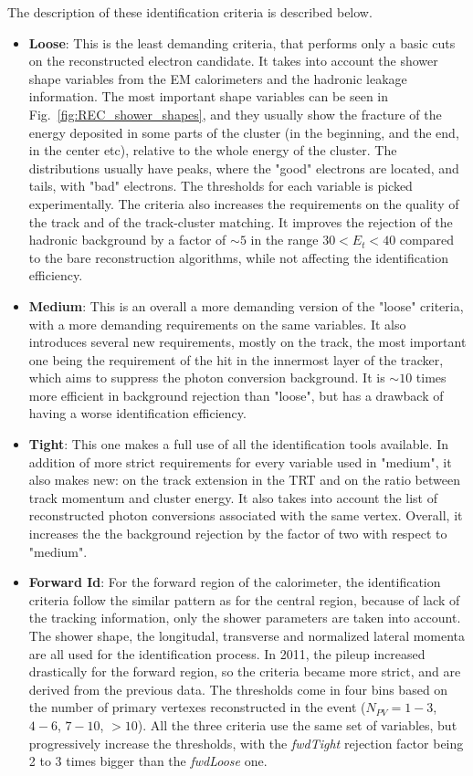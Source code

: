 The description of these identification criteria is described below.
\begin{itemize}
\item {\bfseries Loose}: This is the least demanding criteria, that performs only a basic cuts on the reconstructed electron candidate. It takes into account the shower shape variables from the EM calorimeters and the hadronic leakage information. The most important shape variables can be seen in Fig.~\ref{fig:REC_shower_shapes}, and they usually show the fracture of the energy deposited in some parts of the cluster (in the beginning, and the end, in the center etc), relative to the whole energy of the cluster. The distributions usually have peaks, where the "good" electrons are located, and tails, with "bad" electrons. The thresholds for each variable is picked experimentally. The criteria also increases the requirements on the quality of the track and of the track-cluster matching. It improves the rejection of the hadronic background by a factor of $\sim 5$ in the range $30 < E_{t} < 40$ compared to the bare reconstruction algorithms, while not affecting the identification efficiency.
\item {\bfseries Medium}: This is an overall a more demanding version of the "loose" criteria, with a more demanding requirements on the same variables. It also introduces several new requirements, mostly on the track, the most important one being the requirement of the hit in the innermost layer of the tracker, which aims to suppress the photon conversion background. It is $\sim 10$ times more efficient in background rejection than "loose", but has a drawback of having a worse identification efficiency.
\item {\bfseries Tight}: This one makes a full use of all the identification tools available. In addition of more strict requirements for every variable used in "medium", it also makes new: on the track extension in the TRT and on the ratio between track momentum and cluster energy. It also takes into account the list of reconstructed photon conversions associated with the same vertex. Overall, it increases the the background rejection by the factor of two with respect to "medium".
\item {\bfseries Forward Id}: For the forward region of the calorimeter, the identification criteria follow the similar pattern as for the central region, because of lack of the tracking information, only the shower parameters are taken into account. The shower shape, the longitudal, transverse and normalized lateral momenta are all used for the identification process. In 2011, the pileup increased drastically for the forward region, so the criteria became more strict, and are derived from the previous data. The thresholds come in four bins based on the number of primary vertexes reconstructed in the event ($N_{PV} = 1-3$, $4-6$, $7-10$, $>10$). All the three criteria use the same set of variables, but progressively increase the thresholds, with the {\itshape fwdTight} rejection factor being 2 to 3 times bigger than the {\itshape fwdLoose} one.
\end{itemize}

